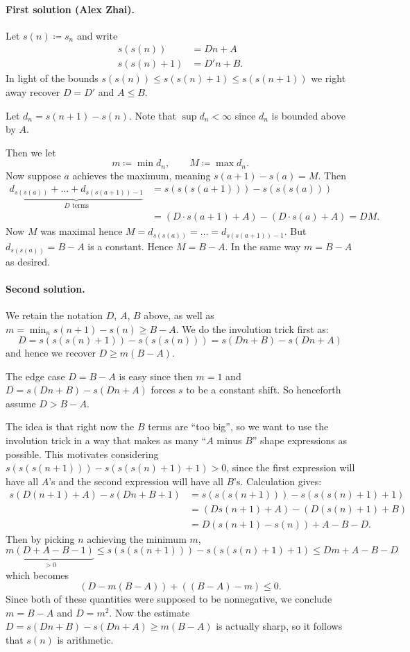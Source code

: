 \documentclass[11pt]{scrartcl}
\begin{document}
\paragraph{First solution (Alex Zhai).}
Let $s(n) \coloneqq s_n$ and write
\begin{align*}
  s(s(n)) &= Dn + A \\
  s(s(n)+1) &= D'n + B.
\end{align*}
In light of the bounds $s(s(n)) \le s(s(n)+1) \le s(s(n+1))$
we right away recover $D = D'$ and $A \le B$.

Let $d_n = s(n+1)-s(n)$.
Note that $\sup d_n < \infty$ since $d_n$ is bounded above by $A$.

Then we let
\[ m \coloneqq \min d_n, \qquad M \coloneqq \max d_n. \]
Now suppose $a$ achieves the maximum, meaning $s(a+1)-s(a) = M$.
Then
\begin{align*}
  \underbrace{d_{s(s(a))} + \dots + d_{s(s(a+1))-1}}_{D \text{ terms}}
  &= \boxed{s(s(s(a+1))) - s(s(s(a)))} \\
  &= (D \cdot s(a+1) + A) - (D \cdot s(a) + A) = DM.
\end{align*}
Now $M$ was maximal hence $M = d_{s(s(a))} = \dots = d_{s(s(a+1))-1}$.
But $d_{s(s(a))} = B-A$ is a constant.
Hence $M = B-A$.
In the same way $m = B-A$ as desired.

\paragraph{Second solution.}
We retain the notation $D$, $A$, $B$ above,
as well as $m = \min_n s(n+1)-s(n) \ge B-A$.
We do the involution trick first as:
\[ D = \boxed{s(s(s(n)+1)) - s(s(s(n)))} = s(Dn+B) - s(Dn+A) \]
and hence we recover $D \ge m(B-A)$.

The edge case $D = B-A$ is easy since then $m=1$
and $D = s(Dn+B)-s(Dn+A)$ forces $s$ to be a constant shift.
So henceforth assume $D > B-A$.

The idea is that right now the $B$ terms are ``too big'',
so we want to use the involution trick in a way that makes as many
``$A$ minus $B$'' shape expressions as possible.
This motivates considering $s(s(s(n+1))) - s(s(s(n)+1)+1) > 0$,
since the first expression will have all $A$'s
and the second expression will have all $B$'s.
Calculation gives:
\begin{align*}
  s(D(n+1)+A) - s(Dn+B+1)
  &= \boxed{s(s(s(n+1))) - s(s(s(n)+1)+1)} \\
  &= (Ds(n+1) + A) - (D(s(n)+1) + B) \\
  &= D\left( s(n+1)-s(n) \right) + A-B-D.
\end{align*}
Then by picking $n$ achieving the minimum $m$,
\[ \underbrace{m(D+A-B-1)}_{>0} \le s(s(s(n+1))) - s(s(s(n)+1)+1) \le Dm + A-B-D \]
which becomes
\[ \left( D-m(B-A) \right) + \left( (B-A)-m \right) \le 0. \]
Since both of these quantities were supposed to be nonnegative,
we conclude $m = B-A$ and $D = m^2$.
Now the estimate $D = s(Dn+B) - s(Dn+A) \ge m(B-A)$ is actually sharp,
so it follows that $s(n)$ is arithmetic.
\pagebreak
\end{document}
